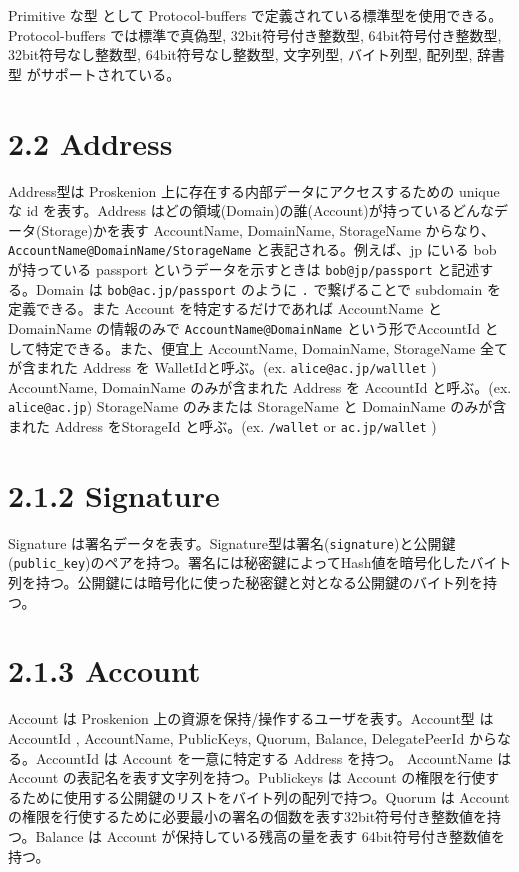 Primitive な型 として Protocol-buffers
で定義されている標準型を使用できる。Protocol-buffers では標準で真偽型,
32bit符号付き整数型, 64bit符号付き整数型, 32bit符号なし整数型,
64bit符号なし整数型, 文字列型, バイト列型, 配列型, 辞書型
がサポートされている。

\hypertarget{address}{%
\section{2.2 Address}\label{address}}

Address型は Proskenion 上に存在する内部データにアクセスするための unique
な id を表す。Address
はどの領域(Domain)の誰(Account)が持っているどんなデータ(Storage)かを表す
AccountName, DomainName, StorageName からなり、
\texttt{AccountName@DomainName/StorageName} と表記される。例えば、jp
にいる bob が持っている passport というデータを示すときは
\texttt{bob@jp/passport} と記述する。Domain は
\texttt{bob@ac.jp/passport} のように \texttt{.} で繋げることで subdomain
を定義できる。また Account を特定するだけであれば AccountName と
DomainName の情報のみで \texttt{AccountName@DomainName}
という形でAccountId として特定できる。また、便宜上 AccountName,
DomainName, StorageName 全てが含まれた Address を WalletIdと呼ぶ。(ex.
\texttt{alice@ac.jp/walllet} ) AccountName, DomainName のみが含まれた
Address を AccountId と呼ぶ。(ex. \texttt{alice@ac.jp}) StorageName
のみまたは StorageName と DomainName のみが含まれた Address をStorageId
と呼ぶ。(ex. \texttt{/wallet} or \texttt{ac.jp/wallet} )

\hypertarget{signature}{%
\section{2.1.2 Signature}\label{signature}}

Signature
は署名データを表す。Signature型は署名(\texttt{signature})と公開鍵(\texttt{public\_key})のペアを持つ。署名には秘密鍵によってHash値を暗号化したバイト列を持つ。公開鍵には暗号化に使った秘密鍵と対となる公開鍵のバイト列を持つ。

\hypertarget{account}{%
\section{2.1.3 Account}\label{account}}

Account は Proskenion 上の資源を保持/操作するユーザを表す。Account型 は
AccountId , AccountName, PublicKeys, Quorum, Balance, DelegatePeerId
からなる。AccountId は Account を一意に特定する Address を持つ。
AccountName は Account の表記名を表す文字列を持つ。Publickeys は Account
の権限を行使するために使用する公開鍵のリストをバイト列の配列で持つ。Quorum
は Account
の権限を行使するために必要最小の署名の個数を表す32bit符号付き整数値を持つ。Balance
は Account が保持している残高の量を表す 64bit符号付き整数値を持つ。

